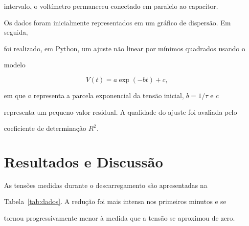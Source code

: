 \documentclass[a4paper,12pt]{article}
\begin{document}
intervalo, o voltímetro permaneceu conectado em paralelo ao capacitor.

Os dados foram inicialmente representados em um gráfico de dispersão. Em seguida,

foi realizado, em Python, um ajuste não linear por mínimos quadrados usando o

modelo

\begin{equation}

  V(t)=a\exp(-bt)+c,

  \label{eq:modelo_ajuste}

\end{equation}

em que $a$ representa a parcela exponencial da tensão inicial, $b=1/\tau$ e $c$

representa um pequeno valor residual. A qualidade do ajuste foi avaliada pelo

coeficiente de determinação $R^2$.




\section{Resultados e Discussão}

As tensões medidas durante o descarregamento são apresentadas na

Tabela~\ref{tab:dados}. A redução foi mais intensa nos primeiros minutos e se

tornou progressivamente menor à medida que a tensão se aproximou de zero.
\end{document}
